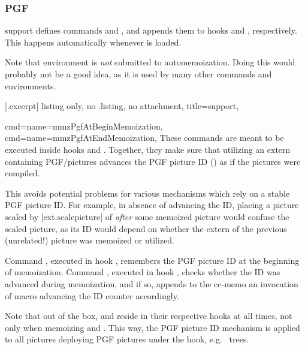 \documentclass[a4paper,11pt]{article}
\begin{document}
\subsubsection{PGF}
\label{sec:support:pgf}

\PGF support defines commands  and
, and appends them to hooks  and , respectively.  This happens
automatically whenever \PGF is loaded.

Note that environment  is \emph{not} submitted to
automemoization.  Doing this would probably not be a good idea, as it is used
by many other commands and environments.

[.excerpt]{%
  listing only, no .listing, no attachment,
  title=\PGF support,
}

\begin{doc}{
    cmd={name=mmzPgfAtBeginMemoization},
    cmd={name=mmzPgfAtEndMemoization},
  }
  These commands are meant to be executed inside hooks  and .  Together, they make sure
  that utilizing an extern containing PGF/\TikZ pictures advances the PGF
  picture ID () as if the pictures were compiled.
  
  This avoids potential problems for various mechanisms which rely on a stable
  PGF picture ID.  For example, in absence of advancing the ID, placing a \TikZ
  picture scaled by |ext.scalepicture| of  \emph{after} some
  memoized \TikZ picture would confuse the scaled picture, as its ID would
  depend on whether the extern of the previous (unrelated!)  picture was
  memoized or utilized.

  Command , executed in hook , remembers the PGF picture ID at the beginning of memoization.
  Command , executed in hook , checks whether the ID was advanced during memoization, and if
  so, appends to the cc-memo an invocation of macro
   advancing the ID counter accordingly.

  Note that out of the box,  and
   reside in their respective hooks at all
  times, not only when memoizing  and .  This
  way, the PGF picture ID mechanism is applied to all pictures deploying PGF
  pictures under the hook, e.g.\  trees.
\end{doc}
\end{document}
